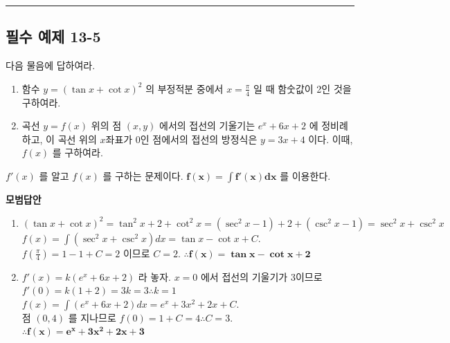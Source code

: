 \documentclass[a4paper,11pt]{article}
\begin{document}
\vspace{0.5cm}
\hrule
\vspace{0.5cm}

\subsection*{필수 예제 13-5}
다음 물음에 답하여라.
\begin{enumerate}[label=(\arabic*)]
    \item 함수 $y=(\tan x + \cot x)^2$ 의 부정적분 중에서 $x=\frac{\pi}{4}$ 일 때 함숫값이 2인 것을 구하여라.
    \item 곡선 $y=f(x)$ 위의 점 $(x,y)$ 에서의 접선의 기울기는 $e^x+6x+2$ 에 정비례하고, 이 곡선 위의 $x$좌표가 0인 점에서의 접선의 방정식은 $y=3x+4$ 이다. 이때, $f(x)$ 를 구하여라.
\end{enumerate}

\begin{studybox}
$f'(x)$ 를 알고 $f(x)$ 를 구하는 문제이다. $\mathbf{f(x)=\int f'(x)dx}$ 를 이용한다.
\end{studybox}

\textbf{모범답안}
\begin{enumerate}[label=(\arabic*)]
    \item $\displaystyle (\tan x + \cot x)^2 = \tan^2 x + 2 + \cot^2 x = (\sec^2 x - 1) + 2 + (\csc^2 x - 1) = \sec^2 x + \csc^2 x$\\
    $f(x) = \int (\sec^2 x + \csc^2 x)dx = \tan x - \cot x + C$. \\
    $f(\frac{\pi}{4}) = 1-1+C=2$ 이므로 $C=2$. $\therefore \mathbf{f(x) = \tan x - \cot x + 2}$
    \item $f'(x)=k(e^x+6x+2)$ 라 놓자. $x=0$ 에서 접선의 기울기가 3이므로 $f'(0)=k(1+2)=3k=3 \therefore k=1$\\
    $f(x) = \int (e^x+6x+2)dx = e^x+3x^2+2x+C$. \\
    점 $(0,4)$ 를 지나므로 $f(0)=1+C=4 \therefore C=3$. $\therefore \mathbf{f(x) = e^x+3x^2+2x+3}$
\end{enumerate}
\end{document}
